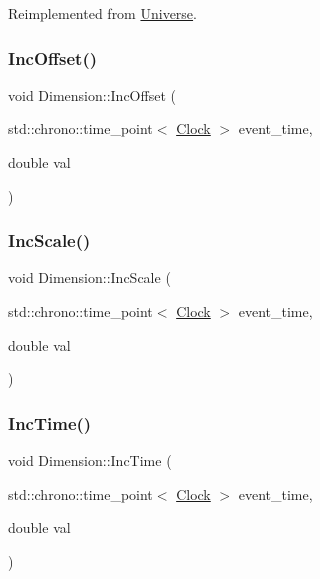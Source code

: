Reimplemented from \mbox{\hyperlink{classUniverse_a645299738e6b798a037f2a15a2e7cf4d}{Universe}}.

\mbox{\label{classDimension_aaf18cc220562b30f9e7aee92f16cc08e}} 
\subsubsection{\texorpdfstring{Inc\+Offset()}{IncOffset()}}
{\footnotesize\ttfamily void Dimension\+::\+Inc\+Offset (\begin{DoxyParamCaption}\item[{std\+::chrono\+::time\+\_\+point$<$ \mbox{\hyperlink{universe_8h_a0ef8d951d1ca5ab3cfaf7ab4c7a6fd80}{Clock}} $>$}]{event\+\_\+time,  }\item[{double}]{val }\end{DoxyParamCaption})}

\mbox{\label{classDimension_aa323eaa2c592e498d48e0739009ec313}} 
\subsubsection{\texorpdfstring{Inc\+Scale()}{IncScale()}}
{\footnotesize\ttfamily void Dimension\+::\+Inc\+Scale (\begin{DoxyParamCaption}\item[{std\+::chrono\+::time\+\_\+point$<$ \mbox{\hyperlink{universe_8h_a0ef8d951d1ca5ab3cfaf7ab4c7a6fd80}{Clock}} $>$}]{event\+\_\+time,  }\item[{double}]{val }\end{DoxyParamCaption})}

\mbox{\label{classDimension_afc61c6d6d68ec0ed461458d504fec16f}} 
\subsubsection{\texorpdfstring{Inc\+Time()}{IncTime()}}
{\footnotesize\ttfamily void Dimension\+::\+Inc\+Time (\begin{DoxyParamCaption}\item[{std\+::chrono\+::time\+\_\+point$<$ \mbox{\hyperlink{universe_8h_a0ef8d951d1ca5ab3cfaf7ab4c7a6fd80}{Clock}} $>$}]{event\+\_\+time,  }\item[{double}]{val }\end{DoxyParamCaption})}


